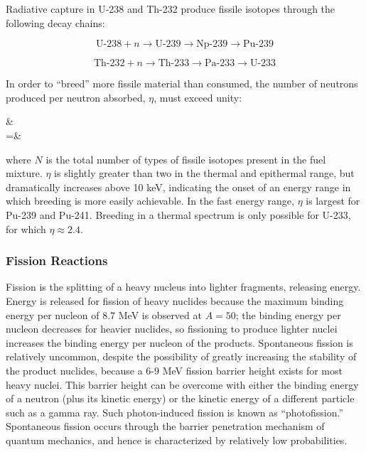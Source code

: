 Radiative capture in U-238 and Th-232 produce fissile isotopes through the following decay chains:

\begin{equation*}
\text{U-238} + n\rightarrow \text{U-239}\rightarrow \text{Np-239}\rightarrow \text{Pu-239}
\end{equation*}

\begin{equation*}
\text{Th-232}+n\rightarrow \text{Th-233}\rightarrow \text{Pa-233}\rightarrow \text{U-233}
\end{equation*}

In order to ``breed'' more fissile material than consumed, the number of neutrons produced per neutron absorbed, \(\eta\), must exceed unity:

\beqa
\label{eq:Eta2Def}
\eta\equiv&\\
=&
\eeqa

where \(N\) is the total number of types of fissile isotopes present in the fuel mixture. \(\eta\) is slightly greater than two in the thermal and epithermal range, but dramatically increases above 10 keV, indicating the onset of an energy range in which breeding is more easily achievable. In the fast energy range, \(\eta\) is largest for Pu-239 and Pu-241. Breeding in a thermal spectrum is only possible for U-233, for which \(\eta\approx2.4\). 

\subsubsection{Fission Reactions}

Fission is the splitting of a heavy nucleus into lighter fragments, releasing energy. Energy is released for fission of heavy nuclides because the maximum binding energy per nucleon of 8.7 MeV is observed at \(A=50\); the binding energy per nucleon decreases for heavier nuclides, so fissioning to produce lighter nuclei increases the binding energy per nucleon of the products. Spontaneous fission is relatively uncommon, despite the possibility of greatly increasing the stability of the product nuclides, because a 6-9 MeV fission barrier height exists for most heavy nuclei. This barrier height can be overcome with either the binding energy of a neutron (plus its kinetic energy) or the kinetic energy of a different particle such as a gamma ray. Such photon-induced fission is known as ``photofission.'' Spontaneous fission occurs through the barrier penetration mechanism of quantum mechanics, and hence is characterized by relatively low probabilities. 

